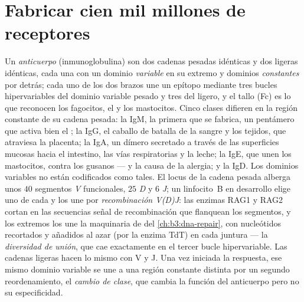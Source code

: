 \section{Fabricar cien mil millones de receptores}

\begin{definition}\label{def:b3:adaptive-immunity:antibody}
Un \emph{anticuerpo} (inmunoglobulina) son dos cadenas pesadas idénticas
y dos ligeras idénticas, cada una con un dominio \emph{variable} en su
extremo y dominios \emph{constantes} por detrás; cada uno de los dos
brazos une un epítopo mediante tres bucles hipervariables del dominio
variable pesado y tres del ligero, y el tallo (Fc) es lo que reconocen
los fagocitos, el  y los mastocitos. Cinco clases difieren en
la región constante de su cadena pesada: la IgM, la primera que se
fabrica, un pentámero que activa bien el ; la IgG, el caballo
de batalla de la sangre y los tejidos, que atraviesa la placenta; la IgA,
un dímero secretado a través de las superficies mucosas hacia el
intestino, las vías respiratorias y la leche; la IgE, que unen los
mastocitos, contra los gusanos --- y la causa de la alergia; y la IgD.
Los dominios variables no están codificados como tales. El locus de la
cadena pesada alberga unos $40$ segmentos \emph{V} funcionales, $25$
\emph{D} y $6$ \emph{J}; un linfocito~B en desarrollo elige uno de cada y
los une por \emph{recombinación V(D)J}: las enzimas RAG1 y RAG2 cortan en
las secuencias señal de recombinación que flanquean los segmentos, y los
extremos los une la maquinaria de  del
\cref{ch:b3:dna-repair}, con nucleótidos recortados y añadidos al azar
(por la enzima TdT) en cada juntura --- la \emph{diversidad de unión},
que cae exactamente en el tercer bucle hipervariable. Las cadenas ligeras
hacen lo mismo con V y J. Una vez iniciada la respuesta, ese mismo
dominio variable se une a una región constante distinta por un segundo
reordenamiento, el \emph{cambio de clase}, que cambia la función del
anticuerpo pero no su especificidad.
\end{definition}

